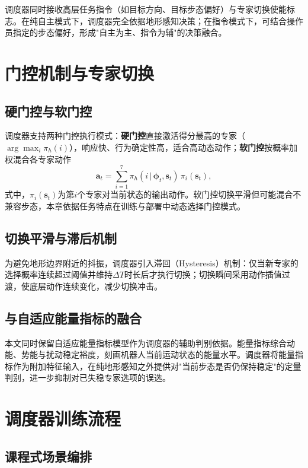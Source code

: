 调度器同时接收高层任务指令（如目标方向、目标步态偏好）与专家切换使能标志。在纯自主模式下，调度器完全依据地形感知决策；在指令模式下，可结合操作员指定的步态偏好，形成"自主为主、指令为辅"的决策融合。

\section{门控机制与专家切换}

\subsection{硬门控与软门控}

调度器支持两种门控执行模式：\textbf{硬门控}直接激活得分最高的专家（$\arg\max_i \pi_h(i)$），响应快、行为确定性高，适合高动态动作；\textbf{软门控}按概率加权混合各专家动作
\begin{equation}
  \boldsymbol{a}_t = \sum_{i=1}^{7}\pi_h(i\,|\,\boldsymbol{\phi}_t,\boldsymbol{s}_t)\,\pi_i(\boldsymbol{s}_t),
  \label{eq:soft-gating}
\end{equation}
式中，$\pi_i(\boldsymbol{s}_t)$为第$i$个专家对当前状态的输出动作。软门控切换平滑但可能混合不兼容步态，本章依据任务特点在训练与部署中动态选择门控模式。

\subsection{切换平滑与滞后机制}

为避免地形边界附近的抖振，调度器引入滞回（Hysteresis）机制：仅当新专家的选择概率连续超过阈值并维持$\Delta T$时长后才执行切换；切换瞬间采用动作插值过渡，使底层动作连续变化，减少切换冲击。

\subsection{与自适应能量指标的融合}

本文同时保留自适应能量指标模型作为调度器的辅助判别依据。能量指标综合动能、势能与扰动稳定裕度，刻画机器人当前运动状态的能量水平。调度器将能量指标作为附加特征输入，在纯地形感知之外提供对"当前步态是否仍保持稳定"的定量判别，进一步抑制对已失稳专家选项的误选。

\section{调度器训练流程}

\subsection{课程式场景编排}

